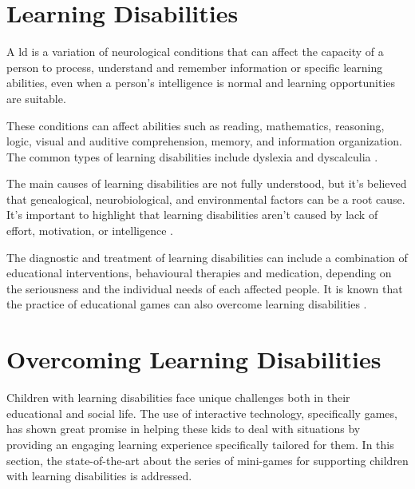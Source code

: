 \section{Learning Disabilities}
\label{section:learningdisabilityexplanation}
A \gls{ld} is a variation of neurological conditions that can affect the capacity of a person to process, understand and remember information or specific learning abilities, even when a person’s intelligence is normal and learning opportunities are suitable.

These conditions can affect abilities such as reading, mathematics, reasoning, logic, visual and auditive comprehension, memory, and information organization. The common types of learning disabilities include dyslexia and dyscalculia \cite{NINDSLearningDisabilities}.


The main causes of learning disabilities are not fully understood, but it’s believed that genealogical, neurobiological, and environmental factors can be a root cause. It’s important to highlight that learning disabilities aren’t caused by lack of effort, motivation, or intelligence \cite{UniversityWashingtonLearningDisabilities}.

The diagnostic and treatment of learning disabilities can include a combination of educational interventions, behavioural therapies and medication, depending on the seriousness and the individual needs of each affected people. It is known that the practice of educational games can also overcome learning disabilities \cite{NINDSLearningDisabilities}.

\section{Overcoming Learning Disabilities}
\label{sec:overcomingLds}

Children with learning disabilities face unique challenges both in their educational and social life. The use of interactive technology, specifically games, has shown great promise in helping these kids to deal with situations by providing an engaging learning experience specifically tailored for them. In this section, the state-of-the-art about the series of mini-games for supporting children with learning disabilities is addressed.

